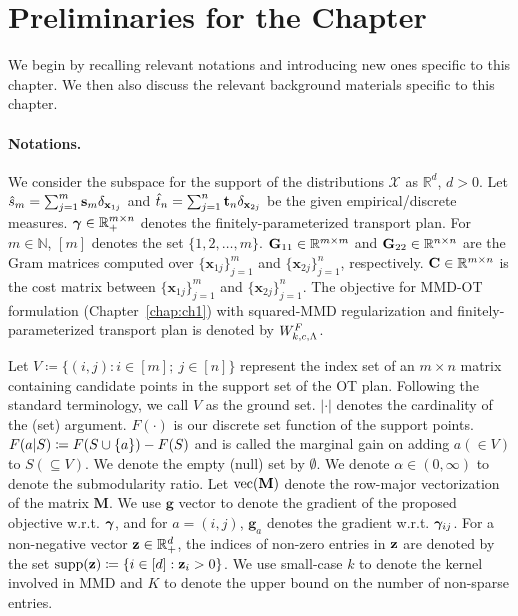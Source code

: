 \section{Preliminaries for the Chapter}\label{sec:sot-prel}
We begin by recalling relevant notations and introducing new ones specific to this chapter. We then also discuss the relevant background materials specific to this chapter.
\paragraph{Notations.} We consider the subspace for the support of the distributions $\mathcal{X}$ as $\mathbb{R}^d$, $d>0$. Let $\hat{s}_m=\sum_{j=1}^m \mathbf{s}_m \delta_{\mathbf{x}_{1j}}$ and $\hat{t}_n=\sum_{j=1}^n \mathbf{t}_n \delta_{\mathbf{x}_{2j}}$ be the given empirical/discrete measures. $\bm{\gamma} \in \mathbb{R}_+^{m\times n}$ denotes the finitely-parameterized transport plan. For $m \in \mathbb{N}$, $[m] $ denotes the set $  \{1,2,\dots, m\}$. $\mathbf{G}_{11}\in \mathbb{R}^{m\times m}$ and $\mathbf{G}_{22}\in \mathbb{R}^{n\times n}$ are the Gram matrices computed over $\{\mathbf{x}_{1j}\}_{j=1}^m$ and $\{\mathbf{x}_{2j}\}_{j=1}^n$, respectively. $\mathbf{C}\in \mathbb{R}^{m\times n}$ is the cost matrix between $\{\mathbf{x}_{1j}\}_{j=1}^m$ and $\{\mathbf{x}_{2j}\}_{j=1}^n$. The objective for MMD-OT formulation (Chapter~\ref{chap:ch1}) with squared-MMD regularization and finitely-parameterized transport plan is denoted by $W^F_{k, c, \Lambda}$.


Let $V\coloneqq \{(i,j): i\in[m];\ j\in [n]\}$ represent the index set of an $m\times n$ matrix containing candidate points in the support set of the OT plan. Following the standard terminology, we call $V$ as the ground set. $|\cdot|$ denotes the cardinality of the (set) argument. $F(\cdot)$ is our discrete set function of the support points. $F(a|S)\coloneqq F(S\cup \{a\})-F(S)$ and is called the marginal gain on adding $a(\in V)$ to $S(\subseteq V)$. We denote the empty (null) set by $\emptyset$. We denote $\alpha\in (0, \infty)$ to denote the submodularity ratio.
Let ${\rm vec}(\mathbf{M})$ denote the row-major vectorization of the matrix $\mathbf{M}$. We use $\mathbf{g}$ vector to denote the gradient of the proposed objective w.r.t. $\bm{\gamma}$, and for $a= (i, j)$, $\mathbf{g}_a$ denotes the gradient w.r.t. $\bm{\gamma}_{ij}$.
For a non-negative vector $\mathbf{z}\in\mathbb{R}^d_{+}$, the indices of non-zero entries in $\mathbf{z}$  are denoted by the set $\textup{supp}(\mathbf{z})\coloneqq \{i\in [d]:\mathbf{z}_i>0\}$. We use small-case $k$ to denote the kernel involved in MMD and $K$ to denote the upper bound on the number of non-sparse entries.
